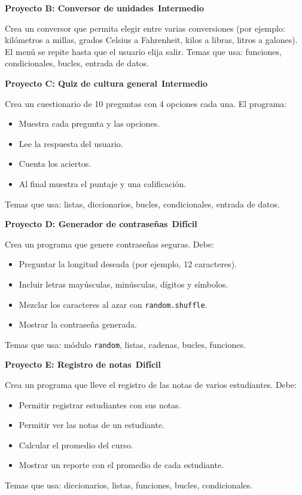 \documentclass[11pt,a4paper]{article}
\newcommand{\intermedio}{\textcolor{naranjaVivo}{\faIcon{circle}\,\textbf{Intermedio}}}
\newcommand{\dificil}{\textcolor{rojoAlerta}{\faIcon{circle}\,\textbf{Difícil}}}
\begin{document}
\begin{cajaEjercicio}
\textbf{Proyecto B: Conversor de unidades} \intermedio

Crea un conversor que permita elegir entre varias conversiones (por ejemplo: kilómetros a millas, grados Celsius a Fahrenheit, kilos a libras, litros a galones). El menú se repite hasta que el usuario elija salir.
Temas que usa: funciones, condicionales, bucles, entrada de datos.
\end{cajaEjercicio}

\begin{cajaEjercicio}
\textbf{Proyecto C: Quiz de cultura general} \intermedio

Crea un cuestionario de 10 preguntas con 4 opciones cada una. El programa:
\begin{itemize}
    \item Muestra cada pregunta y las opciones.
    \item Lee la respuesta del usuario.
    \item Cuenta los aciertos.
    \item Al final muestra el puntaje y una calificación.
\end{itemize}
Temas que usa: listas, diccionarios, bucles, condicionales, entrada de datos.
\end{cajaEjercicio}

\begin{cajaEjercicio}
\textbf{Proyecto D: Generador de contraseñas} \dificil

Crea un programa que genere contraseñas seguras. Debe:
\begin{itemize}
    \item Preguntar la longitud deseada (por ejemplo, 12 caracteres).
    \item Incluir letras mayúsculas, minúsculas, dígitos y símbolos.
    \item Mezclar los caracteres al azar con \texttt{random.shuffle}.
    \item Mostrar la contraseña generada.
\end{itemize}
Temas que usa: módulo \texttt{random}, listas, cadenas, bucles, funciones.
\end{cajaEjercicio}

\begin{cajaEjercicio}
\textbf{Proyecto E: Registro de notas} \dificil

Crea un programa que lleve el registro de las notas de varios estudiantes. Debe:
\begin{itemize}
    \item Permitir registrar estudiantes con sus notas.
    \item Permitir ver las notas de un estudiante.
    \item Calcular el promedio del curso.
    \item Mostrar un reporte con el promedio de cada estudiante.
\end{itemize}
Temas que usa: diccionarios, listas, funciones, bucles, condicionales.
\end{cajaEjercicio}
\end{document}
